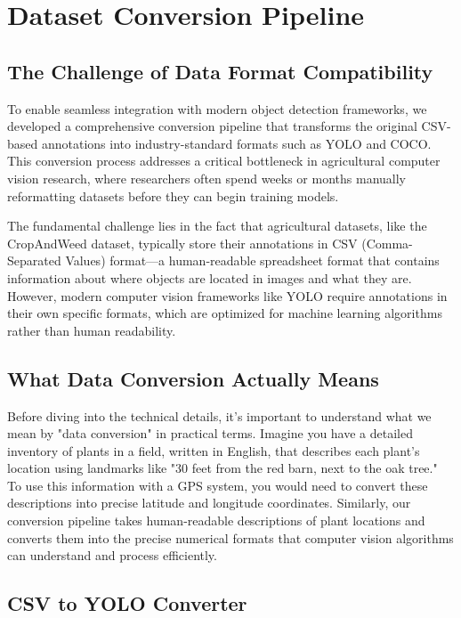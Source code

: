 \section{Dataset Conversion Pipeline}
\subsection{The Challenge of Data Format Compatibility}

To enable seamless integration with modern object detection frameworks, we developed a comprehensive conversion pipeline that transforms the original CSV-based annotations into industry-standard formats such as YOLO and COCO. This conversion process addresses a critical bottleneck in agricultural computer vision research, where researchers often spend weeks or months manually reformatting datasets before they can begin training models.

The fundamental challenge lies in the fact that agricultural datasets, like the CropAndWeed dataset, typically store their annotations in CSV (Comma-Separated Values) format—a human-readable spreadsheet format that contains information about where objects are located in images and what they are. However, modern computer vision frameworks like YOLO require annotations in their own specific formats, which are optimized for machine learning algorithms rather than human readability.

\subsection{What Data Conversion Actually Means}

Before diving into the technical details, it's important to understand what we mean by "data conversion" in practical terms. Imagine you have a detailed inventory of plants in a field, written in English, that describes each plant's location using landmarks like "30 feet from the red barn, next to the oak tree." To use this information with a GPS system, you would need to convert these descriptions into precise latitude and longitude coordinates. Similarly, our conversion pipeline takes human-readable descriptions of plant locations and converts them into the precise numerical formats that computer vision algorithms can understand and process efficiently.

\subsection{CSV to YOLO Converter}

